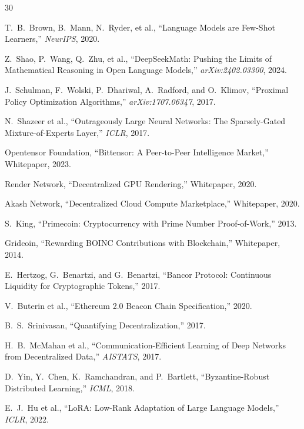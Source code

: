 \documentclass[11pt,letterpaper]{article}
\begin{document}

\begin{thebibliography}{30}

T.~B.~Brown, B.~Mann, N.~Ryder, et al., ``Language Models are Few-Shot Learners,'' \textit{NeurIPS}, 2020.

Z.~Shao, P.~Wang, Q.~Zhu, et al., ``DeepSeekMath: Pushing the Limits of Mathematical Reasoning in Open Language Models,'' \textit{arXiv:2402.03300}, 2024.

J.~Schulman, F.~Wolski, P.~Dhariwal, A.~Radford, and O.~Klimov, ``Proximal Policy Optimization Algorithms,'' \textit{arXiv:1707.06347}, 2017.

N.~Shazeer et al., ``Outrageously Large Neural Networks: The Sparsely-Gated Mixture-of-Experts Layer,'' \textit{ICLR}, 2017.

Opentensor Foundation, ``Bittensor: A Peer-to-Peer Intelligence Market,'' Whitepaper, 2023.

Render Network, ``Decentralized GPU Rendering,'' Whitepaper, 2020.

Akash Network, ``Decentralized Cloud Compute Marketplace,'' Whitepaper, 2020.

S.~King, ``Primecoin: Cryptocurrency with Prime Number Proof-of-Work,'' 2013.

Gridcoin, ``Rewarding BOINC Contributions with Blockchain,'' Whitepaper, 2014.

E.~Hertzog, G.~Benartzi, and G.~Benartzi, ``Bancor Protocol: Continuous Liquidity for Cryptographic Tokens,'' 2017.

V.~Buterin et al., ``Ethereum 2.0 Beacon Chain Specification,'' 2020.

B.~S.~Srinivasan, ``Quantifying Decentralization,'' 2017.

H.~B.~McMahan et al., ``Communication-Efficient Learning of Deep Networks from Decentralized Data,'' \textit{AISTATS}, 2017.

D.~Yin, Y.~Chen, K.~Ramchandran, and P.~Bartlett, ``Byzantine-Robust Distributed Learning,'' \textit{ICML}, 2018.

E.~J.~Hu et al., ``LoRA: Low-Rank Adaptation of Large Language Models,'' \textit{ICLR}, 2022.


\end{thebibliography}
\end{document}
